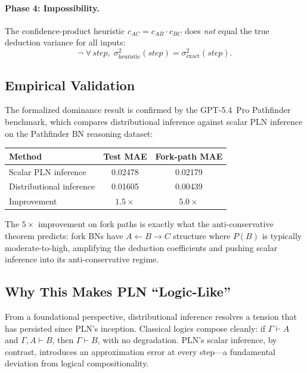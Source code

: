 \documentclass[11pt,openany]{report}
\begin{document}
\paragraph{Phase 4: Impossibility.}
\begin{theorem}
\label{thm:confidence-product-not-variance-preserving}
The confidence-product heuristic $c_{AC} = c_{AB} \cdot c_{BC}$ does
\emph{not} equal the true deduction variance for all inputs:
\[
  \neg\;\forall\, \mathit{step},\;
    \sigma^2_{\mathrm{heuristic}}(\mathit{step})
    = \sigma^2_{\mathrm{exact}}(\mathit{step}).
\]
\end{theorem}

\subsection*{Empirical Validation}

The formalized dominance result is confirmed by the GPT-5.4~Pro Pathfinder
benchmark, which compares distributional inference against scalar PLN
inference on the Pathfinder BN reasoning dataset:

\begin{center}
\begin{tabular}{lcc}
\toprule
\textbf{Method} & \textbf{Test MAE} & \textbf{Fork-path MAE} \\
\midrule
Scalar PLN inference & 0.02478 & 0.02179 \\
Distributional inference & 0.01605 & 0.00439 \\
\midrule
Improvement & $1.5\times$ & $5.0\times$ \\
\bottomrule
\end{tabular}
\end{center}

The $5\times$ improvement on fork paths is exactly what the
anti-conservative theorem predicts: fork BNs have $A \leftarrow B \to C$
structure where $P(B)$ is typically moderate-to-high, amplifying the
deduction coefficients and pushing scalar inference into its
anti-conservative regime.

\subsection*{Why This Makes PLN ``Logic-Like''}

From a foundational perspective, distributional inference resolves a
tension that has persisted since PLN's inception.  Classical logics compose
cleanly: if $\Gamma \vdash A$ and $\Gamma, A \vdash B$, then
$\Gamma \vdash B$, with no degradation.  PLN's scalar inference, by
contrast, introduces an approximation error at every step---a fundamental
deviation from logical compositionality.
\end{document}
